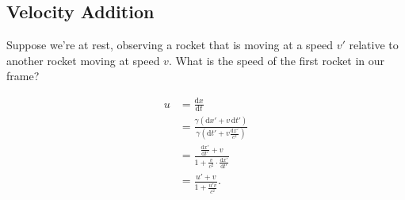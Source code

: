 \documentclass[class=article, crop=false]{standalone}
\begin{document}
  \subsection{Velocity Addition}
  Suppose we're at rest, observing a rocket that is moving at a speed $v'$ relative to another rocket moving at speed $v$. What is the speed of the first rocket in our frame? \par
  \begin{align*}
    u &= \frac{\mathrm{d}x}{\mathrm{d}t} \\
      &= \frac{\gamma (\mathrm{d}x' + v\,\mathrm{d}t')}{\gamma(\mathrm{d}t' + v \frac{\mathrm{d}x'}{c^2})} \\
      &= \frac{\frac{\mathrm{d}x'}{\mathrm{d}t'} + v}{1 + \frac{v}{c^2}\cdot \frac{\mathrm{d}x'}{\mathrm{d}t'}} \\
      &= \frac{u' + v}{1 + \frac{u'v}{c^2}}.
  \end{align*}
\end{document}
